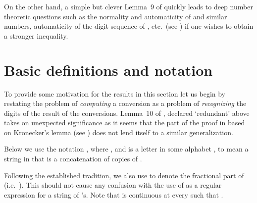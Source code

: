 \documentclass[12pt]{article}
\begin{document}
On the other hand, a simple but clever Lemma~9 of \cite{Clinger}
quickly leads to deep number theoretic questions such as the normality
and automaticity of  and similar numbers, automaticity of the digit sequence
of , etc.\ (see \cite{Allouche}) if one wishes to obtain a
stronger inequality.
 
\section{Basic definitions and notation}\label{autom}
To provide some motivation for the results in this section let us begin
by restating the problem of {\it 
  computing\/} a conversion as a problem of {\it recognizing\/} the
digits of the result of the conversions. Lemma~10 of \cite{Clinger},
declared `redundant' above takes on unexpected significance as it
seems that the part of the proof in \cite{Clinger} based on
Kronecker's lemma (see \cite{Hardy}) does not lend itself to a similar
generalization. 

Below we use the notation , where , and  is a
letter in some alphabet , to mean a string in  that
is a concatenation of  copies of .

\iffalse
Given the `input radix' {\tt D}, the `output radix' {\tt d}, and the
`exponent radix' , consider the following language  where {\tt 1} and {\tt 0} are
-digits. This language can be partitioned into , , where 

We again assume  for simplicity. It is easy to see that if
one of  is not a regular language, then the sequence  above is not -automatic thus proving that radix
conversions cannot be computed using finite automata. For some
combinations of  and {\tt d} we have the following stronger statement:
\begin{lemma}\label{cling}Provided , some of  are not context-free.
\end{lemma}
\begin{proof}Suppose  is context free for each . Then,
  the standard pumping lemma for CFL's (see \cite{hum}) implies that for
  each such  there
  exist  such that for any  . Putting  to be the product of all 's
  we conclude that for a large enough , if 
  then so is . Using Lemma~9 of \cite{Clinger} there
  is an arbitrarily large  such that

The same argument as that of Lemma~10 of \cite{Clinger} shows that
this contradicts  and  both being
in .
\end{proof}
\fi

Following the established tradition, we also use  to
denote the fractional part of 
(i.e.~). This should not cause any confusion
with the use of  as a regular expression for a string of
's. Note that  is continuous at
every  such that .
\end{document}
